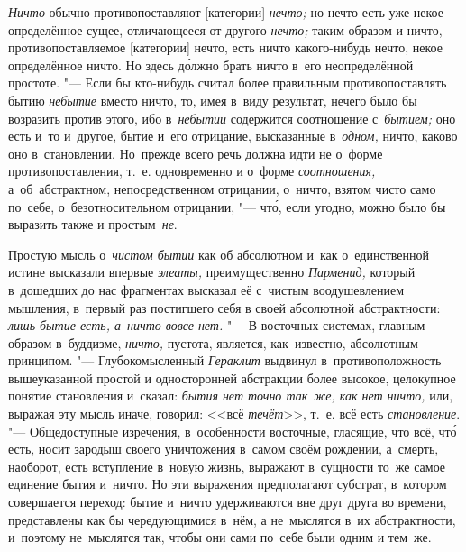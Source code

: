 {\em Ничто} обычно противопоставляют [категории] {\em нечто;} но нечто есть
уже некое определённое сущее, отличающееся от другого {\em нечто;} таким образом
и ничто, противопоставляемое [категории] нечто, есть ничто какого-нибудь нечто,
некое определённое ничто. Но здесь д\'{о}лжно брать ничто в~его неопределённой
простоте. "--- Если бы кто-нибудь считал более правильным противопоставлять бытию
{\em небытие} вместо ничто, то, имея в~виду результат, нечего было бы возразить
против этого, ибо в~{\em небытии} содержится соотношение с~{\em бытием;} оно
есть и~то и~другое, бытие и~его отрицание, высказанные в~{\em одном,} ничто,
каково оно в~становлении. Но~прежде всего речь должна идти не о~форме
противопоставления, т.~е. одновременно и о~форме {\em соотношения,}
а~об~абстрактном, непосредственном отрицании, о~ничто, взятом чисто само
по~себе, о~безотносительном отрицании, "--- чт\'{о}, если угодно, можно было бы
выразить также и простым~{\em не}.

Простую мысль о~{\em чистом бытии} как об абсолютном и~как о~единственной
истине высказали впервые {\em элеаты,} преимущественно {\em Парменид,} который
в~дошедших до нас фрагментах высказал её с~чистым воодушевлением мышления,
в~первый раз постигшего себя в своей абсолютной абстрактности:
{\em лишь бытие есть, а~ничто вовсе нет.} "--- В восточных системах, главным
образом в~буддизме, {\em ничто,} пустота, является, как~известно, абсолютным
принципом. "--- Глубокомысленный {\em Гераклит} выдвинул в~противоположность
вышеуказанной простой и односторонней абстракции более высокое, целокупное
понятие становления и~сказал: {\em бытия нет точно так~же, как нет ничто,} или,
выражая эту мысль иначе, говорил: <<всё {\em течёт}>>, т.~е. всё есть
{\em становление}. "--- Общедоступные изречения, в~особенности восточные,
гласящие, что всё, чт\'{о} есть, носит зародыш своего уничтожения в~самом своём
рождении, а~смерть, наоборот, есть вступление в~новую жизнь, выражают
в~сущности то~же самое единение бытия и~ничто. Но эти выражения предполагают
субстрат, в~котором совершается переход: бытие и~ничто удерживаются вне друг
друга во времени, представлены как бы чередующимися в~нём, а не~мыслятся в~их
абстрактности, и~поэтому не~мыслятся так, чтобы они сами по~себе были одним и
тем~же.

